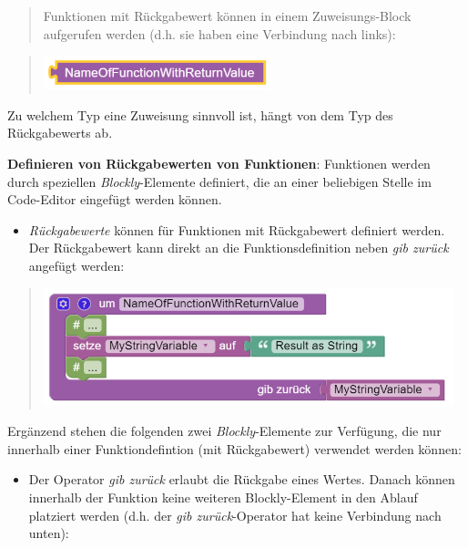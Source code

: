 \documentclass[
  letterpaper,
  DIV=11]{scrreprt}
\providecommand{\tightlist}{%
  \setlength{\itemsep}{0pt}\setlength{\parskip}{0pt}}\usepackage{longtable,booktabs,array}
\begin{document}
\begin{tcolorbox}
\begin{quote}
Funktionen mit Rückgabewert können in einem Zuweisungs-Block aufgerufen
werden (d.h. sie haben eine Verbindung nach links):
\end{quote}

\begin{quote}
\includegraphics[width=2.60417in,height=\textheight]{img/screenshot-blockly-function-call-with-return-value-01-DEU.png}
\end{quote}

Zu welchem Typ eine Zuweisung sinnvoll ist, hängt von dem Typ des
Rückgabewerts ab.

\textbf{Definieren von Rückgabewerten von Funktionen}: Funktionen werden
durch speziellen \emph{Blockly}-Elemente definiert, die an einer
beliebigen Stelle im Code-Editor eingefügt werden können.

\begin{itemize}
\tightlist
\item
  \emph{Rückgabewerte} können für Funktionen mit Rückgabewert definiert
  werden. Der Rückgabewert kann direkt an die Funktionsdefinition neben
  \emph{gib zurück} angefügt werden:
\end{itemize}

\begin{quote}
\includegraphics[width=4.6875in,height=\textheight]{img/screenshot-blockly-function-definition-with-return-value-string-example-01-DEU.png}
\end{quote}

Ergänzend stehen die folgenden zwei \emph{Blockly}-Elemente zur
Verfügung, die nur innerhalb einer Funktiondefintion (mit Rückgabewert)
verwendet werden können:

\begin{itemize}
\tightlist
\item
  Der Operator \emph{gib zurück} erlaubt die Rückgabe eines Wertes.
  Danach können innerhalb der Funktion keine weiteren Blockly-Element in
  den Ablauf platziert werden (d.h. der \emph{gib zurück}-Operator hat
  keine Verbindung nach unten):
\end{itemize}


\end{tcolorbox}
\end{document}
